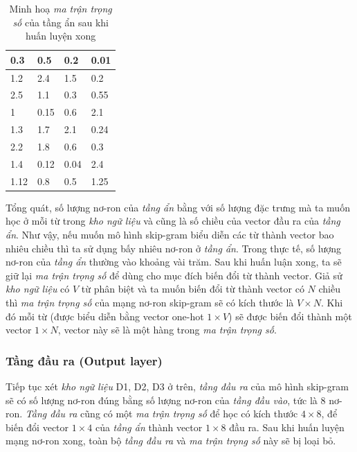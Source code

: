 \begin{table}[!h]
\centering
\begin{tabular}{|l|l|l|l|}
\hline
0.3  & 0.5  & 0.2 & 0.01 \\ \hline
1.2  & 2.4  & 1.5  & 0.2  \\ \hline
2.5  & 1.1  & 0.3  & 0.55 \\ \hline
1    & 0.15 & 0.6  & 2.1  \\ \hline
1.3  & 1.7  & 2.1  & 0.24 \\ \hline
2.2  & 1.8  & 0.6  & 0.3  \\ \hline
1.4  & 0.12 & 0.04 & 2.4  \\ \hline
1.12 & 0.8  & 0.5  & 1.25 \\ \hline
\end{tabular}
\caption{Minh hoạ \textit{ma trận trọng số} của tầng ẩn sau khi huấn luyện xong}
\label{tab:hidden-layer-weight-matrix}
\end{table}

Tổng quát, số lượng nơ-ron của \textit{tầng ẩn} bằng với số lượng đặc trưng mà ta muốn học ở mỗi từ trong \textit{kho ngữ liệu} và cũng là số chiều của vector đầu ra của \textit{tầng ẩn}. Như vậy, nếu muốn mô hình skip-gram biểu diễn các từ thành vector bao nhiêu chiều thì ta sử dụng bấy nhiêu nơ-ron ở \textit{tầng ẩn}. Trong thực tế, số lượng nơ-ron của \textit{tầng ẩn} thường vào khoảng vài trăm. Sau khi huấn luận xong, ta sẽ giữ lại \textit{ma trận trọng số} để dùng cho mục đích biến đổi từ thành vector. Giả sử \textit{kho ngữ liệu} có $V$ từ phân biệt và ta muốn biến đổi từ thành vector có $N$ chiều thì \textit{ma trận trọng số} của mạng nơ-ron skip-gram sẽ có kích thước là $V\times N$. Khi đó mỗi từ (được biểu diễn bằng vector one-hot $1\times V$) sẽ được biến đổi thành một vector $1\times N$, vector này sẽ là một hàng trong \textit{ma trận trọng số}.

\subsubsection{Tầng đầu ra (Output layer)}
Tiếp tục xét \textit{kho ngữ liệu} D1, D2, D3 ở trên, \textit{tầng đầu ra} của mô hình skip-gram sẽ có số lượng nơ-ron đúng bằng số lượng nơ-ron của \textit{tầng đầu vào}, tức là 8 nơ-ron. \textit{Tầng đầu ra} cũng có một \textit{ma trận trọng số} để học có kích thước $4\times 8$, để biến đổi vector $1\times 4$ của \textit{tầng ẩn} thành vector $1\times 8$ đầu ra. Sau khi huấn luyện mạng nơ-ron xong, toàn bộ \textit{tầng đầu ra} và \textit{ma trận trọng số} này sẽ bị loại bỏ.

